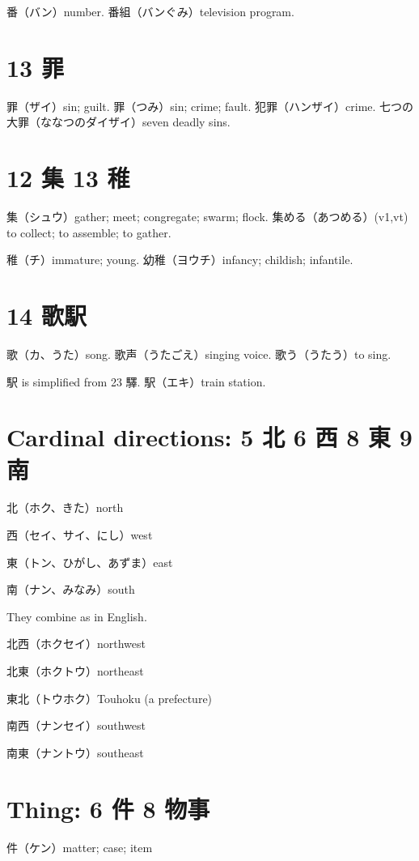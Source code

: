 番（バン）number.
番組（バンぐみ）television program.

\section{13 罪}

罪（ザイ）sin; guilt.
罪（つみ）sin; crime; fault.
犯罪（ハンザイ）crime.
七つの大罪（ななつのダイザイ）seven deadly sins.

\section{12 集 13 稚}

集（シュウ）gather; meet; congregate; swarm; flock.
集める（あつめる）(v1,vt) to collect; to assemble; to gather.

稚（チ）immature; young.
幼稚（ヨウチ）infancy; childish; infantile.

\section{14 歌駅}

歌（カ、うた）song.
歌声（うたごえ）singing voice.
歌う（うたう）to sing.

駅 is simplified from 23 驛.
駅（エキ）train station.

\section{Cardinal directions: 5 北 6 西 8 東 9 南}

北（ホク、きた）north

西（セイ、サイ、にし）west

東（トン、ひがし、あずま）east

南（ナン、みなみ）south

They combine as in English.

北西（ホクセイ）northwest

北東（ホクトウ）northeast

東北（トウホク）Touhoku (a prefecture)

南西（ナンセイ）southwest

南東（ナントウ）southeast

\section{Thing: 6 件 8 物事}

件（ケン）matter; case; item

